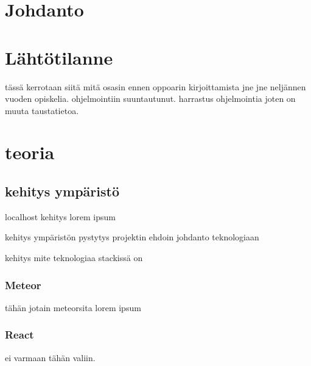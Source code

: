 \documentclass[11pt,a4paper,titlepage,oneside]{article}
\begin{document}
\pagestyle{fancy}
\lfoot{}
\cfoot{}
\rfoot{}
\lhead{}
\chead{}
\rhead{\thepage}
\renewcommand{\headrulewidth}{0pt}
\renewcommand{\footrulewidth}{0pt}


\section{Johdanto}              %

\lipsum[1-2]






\newpage
\section{Lähtötilanne}         %
tässä kerrotaan siitä mitä osasin ennen oppoarin kirjoittamista jne jne
\newline
neljännen vuoden opiskelia. ohjelmointiin suuntautunut. harrastus ohjelmointia joten on muuta taustatietoa.





\newpage
\section{teoria}                %



\subsection{kehitys ympäristö}
localhost kehitys lorem ipsum

kehitys ympäristön pystytys projektin ehdoin
    johdanto teknologiaan

kehitys mite teknologiaa stackissä on

\subsubsection{Meteor}
tähän jotain meteorsita lorem ipsum

\subsubsection{React}
ei varmaan tähän valiin.
\end{document}
